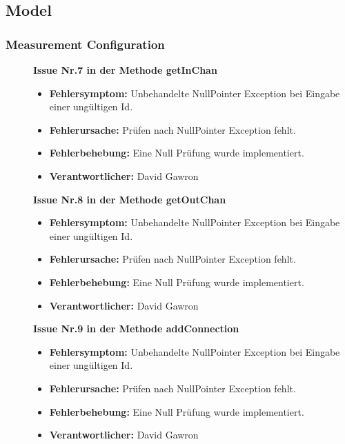 \documentclass[parskip=full]{scrartcl}
\begin{document}
\subsection{Model}
\subsubsection{Measurement Configuration}

\begin{description}
 

\item []\textbf{Issue Nr.7 in der Methode getInChan} 

\begin{itemize}
\item []\textbf{Fehlersymptom:} Unbehandelte NullPointer Exception bei Eingabe einer ungültigen Id.
\item []\textbf{Fehlerursache:} Prüfen nach NullPointer Exception fehlt.
\item []\textbf{Fehlerbehebung:} Eine Null Prüfung wurde implementiert.
\item []\textbf{Verantwortlicher:} David Gawron
\end{itemize}

\item []\textbf{Issue Nr.8 in der Methode getOutChan} 

\begin{itemize}
\item []\textbf{Fehlersymptom:} Unbehandelte NullPointer Exception bei Eingabe einer ungültigen Id.
\item []\textbf{Fehlerursache:} Prüfen nach NullPointer Exception fehlt.
\item []\textbf{Fehlerbehebung:} Eine Null Prüfung wurde implementiert.
\item []\textbf{Verantwortlicher:} David Gawron
\end{itemize}

\item []\textbf{Issue Nr.9 in der Methode addConnection} 

\begin{itemize}
\item []\textbf{Fehlersymptom:} Unbehandelte NullPointer Exception bei Eingabe einer ungültigen Id.
\item []\textbf{Fehlerursache:} Prüfen nach NullPointer Exception fehlt.
\item []\textbf{Fehlerbehebung:} Eine Null Prüfung wurde implementiert.
\item []\textbf{Verantwortlicher:} David Gawron
\end{itemize}


\end{description}
\end{document}
